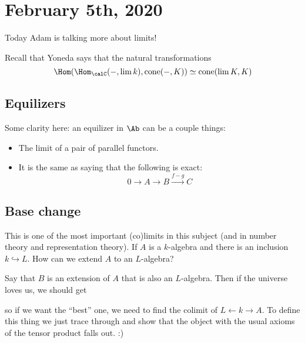 \documentclass[12pt]{article}
\begin{document}
\section{February 5th, 2020}
Today Adam is talking more about limits!

Recall that Yoneda says that the natural transformations 
\[\Hom(\Hom_\calC(-,\lim k),\operatorname{cone}(-,K))\simeq\operatorname{cone}(\lim K,K)\]

\subsection{Equilizers}
Some clarity here: an equilizer in $\Ab$ can be a couple things:
\begin{itemize}
	\item The limit of a pair of parallel functors.
	\item It is the same as saying that the following is exact:
	\[0\to A\to B\xrightarrow{f-g} C\]
\end{itemize}

\subsection{Base change}
This is one of the most important (co)limits in this subject (and in number theory and representation theory).
If $A$ is a $k$-algebra and there is an inclusion $k\hookrightarrow L$. How can we extend $A$ to an $L$-algebra? 

Say that $B$ is an extension of $A$ that is also an $L$-algebra. Then if the universe loves us, we should get 
\begin{figure}[h]
	\centering
\end{figure}
so if we want the ``best'' one, we need to find the colimit of $L\leftarrow k\to A$. To define this thing we just 
trace through and show that the object with the usual axioms of the tensor product falls out. :)
\end{document}
